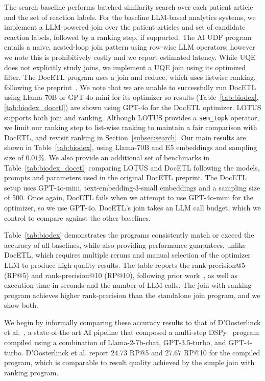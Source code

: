 The search baseline performs batched similarity search over each patient article and the set of reaction labels. For the baseline LLM-based analytics systems, we implement a LLM-powered join over the patient articles and set of candidate reaction labels, followed by a ranking step, if supported. The AI UDF program entails a naive, nested-loop join pattern using row-wise LLM operators; however we note this is prohibitively costly and we report estimated latency. While UQE does not explicitly study joins, we implement a UQE join using its optimized filter. The DocETL program uses a join and reduce, which uses listwise ranking, following the preprint~\cite{shankar_docetl_2024}. We note that we are unable to successfully run DocETL using Llama-70B or GPT-4o-mini for its optimizer so results (Table~\ref{tab:biodex}, \ref{tab:biodex_docetl}) are shown using GPT-4o for the DocETL optimizer. LOTUS supports both join and ranking. Although LOTUS provides a \verb|sem_topk| operator, we limit our ranking step to list-wise ranking to maintain a fair comparison with DocETL, and revisit ranking in Section~\ref{subsec:search}. 
Our main results are shown in Table~\ref{tab:biodex}, using Llama-70B and E5 embeddings and sampling size of $0.01\%$.
We also provide an additional set of benchmarks in Table~\ref{tab:biodex_docetl} comparing LOTUS and DocETL following the models, prompts and parameters used in the original DocETL preprint. The DocETL setup uses GPT-4o-mini, text-embedding-3-small embeddings and a sampling size of 500. Once again, DocETL fails when we attempt to use GPT-4o-mini for the optimizer, so we use GPT-4o. DocETL's join takes an LLM call budget, which we control to compare against the other baselines.






Table~\ref{tab:biodex} demonstrates the \sys programs consistently match or exceed the accuracy of all baselines, while also providing performance guarantees, unlike DocETL, which requires multiple reruns and manual selection of the optimizer LLM to produce high-quality results. The table reports the rank-precision@5 (RP@5) and rank-precision@10 (RP@10), following prior work~\cite{doosterlinck_-context_2024}, as well as execution time in seconds and the number of LLM calls. The \sys join with ranking program achieves higher rank-precision than the standalone \sys join program, and we show both.

We begin by informally comparing these accuracy results to that of D'Oosterlinck et al.~\cite{doosterlinck_-context_2024}, a state-of-the art AI pipeline that composed a multi-step DSPy~\cite{khattab_dspy_2023} program compiled using a combination of Llama-2-7b-chat, GPT-3.5-turbo, and GPT-4-turbo. D'Oosterlinck et al. report 24.73 RP@5 and 27.67 RP@10 for the compiled program, which is comparable to result quality achieved by the simple \sys join with ranking program.

